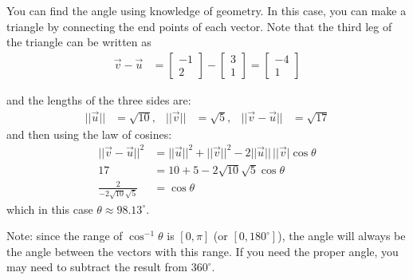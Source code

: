 You can find the angle using knowledge of geometry.  In this case, you can make a triangle by connecting the end points of each vector.  Note that the third leg of the triangle can be written as
%
\begin{align*}
\vec{v}-\vec{u} & = \begin{bmatrix}
-1 \\ 2
\end{bmatrix} - \begin{bmatrix}
3 \\ 1
\end{bmatrix} = \begin{bmatrix}
-4 \\ 1
\end{bmatrix}
\end{align*}


\begin{center}
\end{center}
and the lengths of the three sides are:
%
\begin{align*}
||\vec{u}|| & = \sqrt{10}, & ||\vec{v}|| &= \sqrt{5}, & ||\vec{v}-\vec{u}|| & = \sqrt{17}
\end{align*}
and then using the law of cosines:
%
\begin{align*}
||\vec{v}-\vec{u}||^2 & = ||\vec{u}||^2 + || \vec{v}||^2 -2 ||\vec{u}|| \,  ||\vec{v}| \cos \theta \\
17 & = 10+5 - 2 \sqrt{10}\sqrt{5} \cos \theta \\
\frac{2}{-2 \sqrt{10}\sqrt{5}} & = \cos \theta
\end{align*}
which in this case $\theta \approx 98.13^{\circ}$.


Note: since the range of $\cos^{-1} \theta$ is $[0,\pi]$ (or $[0,180^{\circ}]$), the angle will always be the angle between the vectors with this range.  If you need the proper angle, you may need to subtract the result from $360^{\circ}$.


